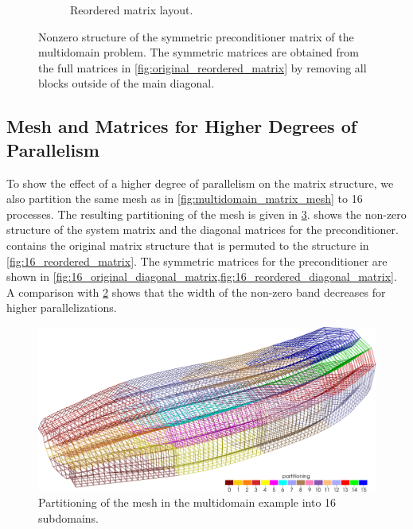\begin{figure}
\begin{subfigure}[t]{0.49\textwidth}
    \caption{Reordered matrix layout.}%
    \label{fig:reordered_diagonal_matrix}%
  \end{subfigure}
  \caption{Nonzero structure of the symmetric preconditioner matrix of the multidomain problem. The symmetric matrices are obtained from the full matrices in \cref{fig:original_reordered_matrix} by removing all blocks outside of the main diagonal.}%
  \label{fig:original_reordered_diagonal_matrix}%
\end{figure}%

\subsection{Mesh and Matrices for Higher Degrees of Parallelism}
To show the effect of a higher degree of parallelism on the matrix structure, we also partition the same mesh as in \cref{fig:multidomain_matrix_mesh} to 16 processes. The resulting partitioning of the mesh is given in \cref{fig:16_multidomain_matrix_mesh}.
 shows the non-zero structure of the system matrix and the diagonal matrices for the preconditioner.  contains the original matrix structure that is permuted to the structure in \cref{fig:16_reordered_matrix}. 
The symmetric matrices for the preconditioner are shown in \cref{fig:16_original_diagonal_matrix,fig:16_reordered_diagonal_matrix}. 
A comparison with \cref{fig:original_reordered_diagonal_matrix} shows that the width of the non-zero band decreases for higher parallelizations.


\begin{figure}
  \centering%
  \includegraphics[width=\textwidth]{images/implementation/16_multidomain_matrix_mesh.png}%
  \caption{Partitioning of the mesh in the multidomain example into 16 subdomains.}%
  \label{fig:16_multidomain_matrix_mesh}%
\end{figure}%

